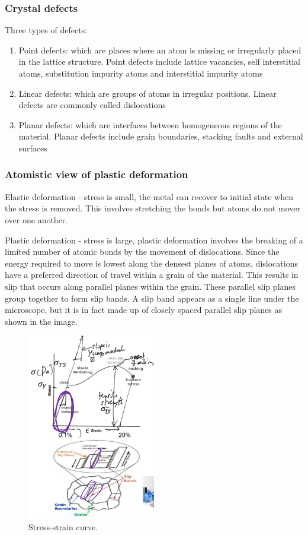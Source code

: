 \subsubsection{Crystal defects}
Three types of defects:
\begin{enumerate}
	\item Point defects: which are places where an atom is missing or irregularly placed in the lattice structure. Point defects include lattice vacancies, self interstitial atoms, substitution impurity atoms and interstitial impurity atoms
	\item Linear defects: which are groups of atoms in irregular positions. Linear defects are commonly called dislocations
	\item Planar defects: which are interfaces between homogeneous regions of the material. Planar defects include grain boundaries, stacking faults and external surfaces
\end{enumerate}
\subsubsection{Atomistic view of plastic deformation}
Elastic deformation - stress is small, the metal can recover to initial state when the stress is removed. This involves stretching the bonds but atoms do not mover over one another.

Plastic deformation - stress is large, plastic deformation involves the breaking of a limited number of atomic bonds by the movement of dislocations. Since the energy required to move is lowest along the densest planes of atoms, dislocations have a preferred direction of travel within a grain of the material. This results in slip that occurs along parallel planes within the grain. These parallel slip planes group together to form slip bands. A slip band appears as a single line under the microscope, but it is in fact made up of closely spaced parallel slip planes as shown in the image.
\begin{figure}[H]
	\centering
	\includegraphics[width = 0.5\textwidth]{./img/figure15.png}
	\caption{Stress-strain curve.}
\end{figure}
